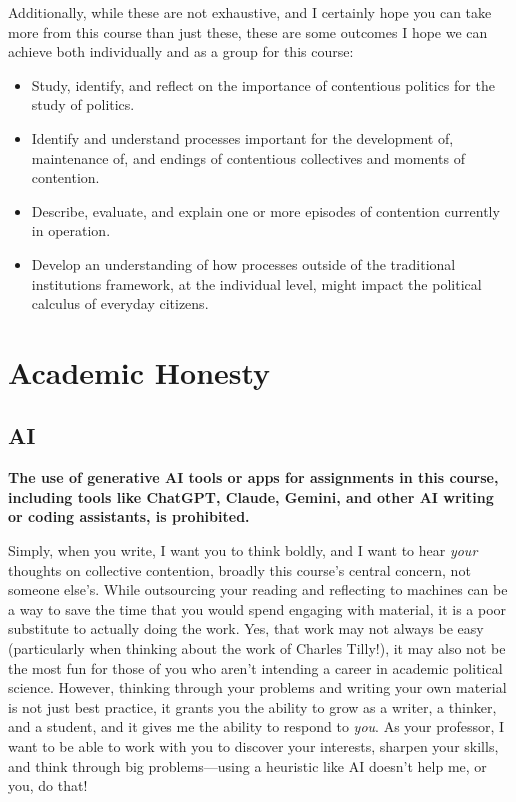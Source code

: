 \documentclass[12pt]{article}
\begin{document}
Additionally, while these are not exhaustive, and I certainly hope you can take more from this course than just these, these are some outcomes I hope we can achieve both individually and as a group for this course:
\begin{itemize}
    \item Study, identify, and reflect on the importance of contentious politics for the study of politics.
    \item Identify and understand processes important for the development of, maintenance of, and endings of contentious collectives and moments of contention.
    \item Describe, evaluate, and explain one or more episodes of contention currently in operation.
    \item Develop an understanding of how processes outside of the traditional institutions framework, at the individual level, might impact the political calculus of everyday citizens.
\end{itemize}

\section*{Academic Honesty}
\subsection*{AI}
\par{\textbf{The use of generative AI tools or apps for assignments in this course, including tools like ChatGPT, Claude, Gemini, and other AI writing or coding assistants, is prohibited.}}

\par{Simply, when you write, I want you to think boldly, and I want to hear \textit{your} thoughts on collective contention, broadly this course's central concern, not someone else's. While outsourcing your reading and reflecting to machines can be a way to save the time that you would spend engaging with material, it is a poor substitute to actually doing the work. Yes, that work may not always be easy (particularly when thinking about the work of Charles Tilly!), it may also not be the most fun for those of you who aren't intending a career in academic political science. However, thinking through your problems and writing your own material is not just best practice, it grants you the ability to grow as a writer, a thinker, and a student, and it gives me the ability to respond to \textit{you}. As your professor, I want to be able to work with you to discover your interests, sharpen your skills, and think through big problems---using a heuristic like AI doesn't help me, or you, do that!}
\end{document}
